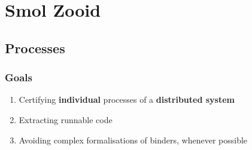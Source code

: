 \section{Smol Zooid}

\subsection{Processes}

\begin{frame}
    \frametitle{Goals}
    \begin{sticky}%
    \vspace{-.7cm}
    \begin{enumerate}
    \item Certifying \textbf{individual} processes of a \textbf{distributed system}
    \item Extracting runnable code
    \item Avoiding complex formalisations of binders, whenever possible
    \end{enumerate}
    \end{sticky}
\end{frame}

